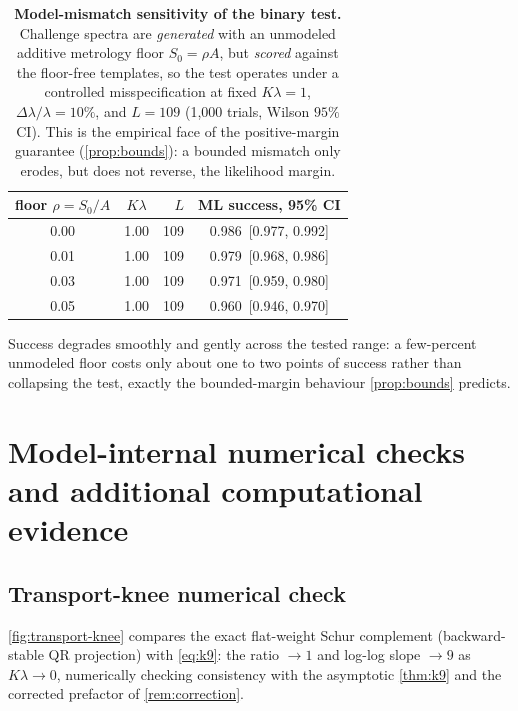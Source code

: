 \documentclass[11pt]{article}
\begin{document}
\begin{table}[htbp]
\centering
\small
\renewcommand{\arraystretch}{1.15}
\caption{\textbf{Model-mismatch sensitivity of the binary test.} Challenge spectra are \emph{generated} with an unmodeled additive metrology floor $S_0=\rho A$, but \emph{scored} against the floor-free templates, so the test operates under a controlled misspecification at fixed $K\lambda=1$, $\Delta\lambda/\lambda=10\%$, and $L=109$ (1,000 trials, Wilson $95\%$ CI). This is the empirical face of the positive-margin guarantee (\cref{prop:bounds}): a bounded mismatch only erodes, but does not reverse, the likelihood margin.}
\label{tab:mismatch}
\setlength{\tabcolsep}{6pt}
\begin{tabular}{c c r c}
\toprule
{floor $\rho=S_0/A$} & {$K\lambda$} & {$L$} & {ML success, 95\% CI} \\
\midrule
0.00 & 1.00 & 109 & 0.986~{\footnotesize [0.977, 0.992]} \\
0.01 & 1.00 & 109 & 0.979~{\footnotesize [0.968, 0.986]} \\
0.03 & 1.00 & 109 & 0.971~{\footnotesize [0.959, 0.980]} \\
0.05 & 1.00 & 109 & 0.960~{\footnotesize [0.946, 0.970]} \\
\bottomrule
\end{tabular}
\par\vspace{3pt}
\begin{minipage}{0.92\linewidth}\footnotesize Success degrades smoothly and gently across the tested range: a few-percent unmodeled floor costs only about one to two points of success rather than collapsing the test, exactly the bounded-margin behaviour \cref{prop:bounds} predicts.\end{minipage}
\end{table}


\section{Model-internal numerical checks and additional computational evidence}
\label{sec:validation}

\subsection{Transport-knee numerical check}

\cref{fig:transport-knee} compares the exact flat-weight Schur complement (backward-stable QR projection) with \eqref{eq:k9}: the ratio \(\to1\) and log-log slope \(\to9\) as \(K\lambda\to0\), numerically checking consistency with the asymptotic \cref{thm:k9} and the corrected prefactor of \cref{rem:correction}.
\end{document}
